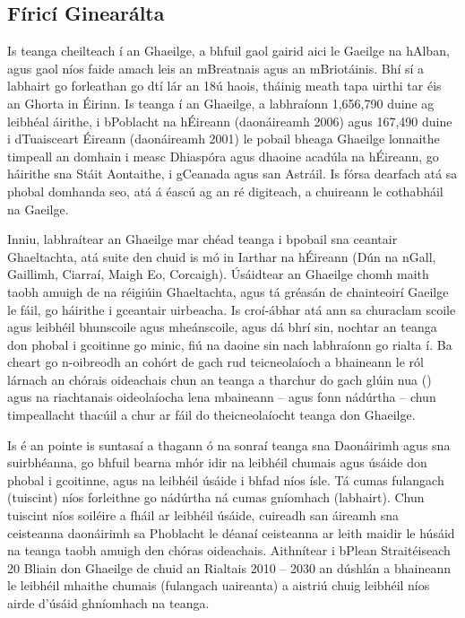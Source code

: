 \begin{multicols}{2}

\subsection{Fíricí Ginearálta}

Is teanga cheilteach í an Ghaeilge, a bhfuil gaol gairid aici le Gaeilge na hAlban, agus gaol níos faide amach leis an mBreatnais agus an mBriotáinis. Bhí sí a labhairt go forleathan go dtí lár an 18ú haois, tháinig meath tapa uirthi tar éis an Ghorta in Éirinn. Is teanga í an Ghaeilge, a labhraíonn 1,656,790 duine ag leibhéal áirithe, i bPoblacht na hÉireann (daonáireamh 2006) agus 167,490 duine i dTuaisceart Éireann (daonáireamh 2001) le pobail bheaga Ghaeilge lonnaithe timpeall an domhain i measc Dhiaspóra agus dhaoine acadúla na hÉireann, go háirithe sna Stáit Aontaithe, i gCeanada agus san Astráil. Is fórsa dearfach atá sa phobal domhanda seo, atá á éascú ag an ré digiteach, a chuireann le cothabháil na Gaeilge.

Inniu, labhraítear an Ghaeilge mar chéad teanga i bpobail sna ceantair Ghaeltachta, atá suite den chuid is mó in Iarthar na hÉireann (Dún na nGall, Gaillimh, Ciarraí, Maigh Eo, Corcaigh). Úsáidtear an Ghaeilge chomh maith taobh amuigh de na réigiúin Ghaeltachta, agus tá gréasán de chainteoirí Gaeilge le fáil, go háirithe i gceantair uirbeacha.   Is croí-ábhar atá ann sa churaclam scoile agus leibhéil bhunscoile agus mheánscoile, agus dá bhrí sin, nochtar an teanga don phobal i gcoitinne go minic, fiú na daoine sin nach labhraíonn go rialta í. Ba cheart go n-oibreodh an cohórt de gach rud teicneolaíoch a bhaineann le ról lárnach an chórais oideachais chun an teanga a tharchur do gach glúin nua (\cite{oriagain97}) agus na riachtanais oideolaíocha lena mbaineann – agus fonn nádúrtha – chun timpeallacht thacúil a chur ar fáil do theicneolaíocht teanga don Ghaeilge.

Is é an pointe is suntasaí a thagann ó na sonraí teanga sna Daonáirimh agus sna suirbhéanna, go bhfuil bearna mhór idir na leibhéil chumais agus úsáide don phobal i gcoitinne, agus na leibhéil úsáide i bhfad níos ísle. Tá cumas fulangach (tuiscint) níos forleithne go nádúrtha ná cumas gníomhach (labhairt). Chun tuiscint níos soiléire a fháil ar leibhéil úsáide, cuireadh san áireamh sna ceisteanna daonáirimh sa Phoblacht le déanaí ceisteanna ar leith maidir le húsáid na teanga taobh amuigh den chóras oideachais. Aithnítear i bPlean Straitéiseach 20 Bliain don Ghaeilge de chuid an Rialtais 2010 -- 2030 an dúshlán a bhaineann le leibhéil mhaithe chumais (fulangach uaireanta) a aistriú chuig leibhéil níos airde d’úsáid ghníomhach na teanga.


\end{multicols}
